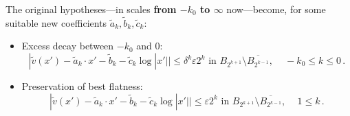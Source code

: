 \documentclass[10pt,a4paper]{amsart}
\newcommand{\ep}{\varepsilon}
\begin{document}
\begin{remark}\label{rmk:89ttqovbaB}
    The original hypotheses---in scales \textbf{from $-k_0$ to $\infty$} now---become, for some suitable new coefficients $\widetilde a_k, \widetilde b_k, \widetilde c_k$:
    \begin{itemize}
    \item Excess decay between $-k_0$ and $0$:
    \begin{equation}\label{eq:52ei7t6siduB}
        |\widetilde v (x')-\widetilde a_k\cdot x'-\widetilde b_k-\widetilde c_k\log|x'||\leq \delta^{k}\ep 2^{k} \mbox{ in } B_{2^{k+1}}\setminus \overline{B_{2^{k-1}}},\,\quad -k_0\leq k \leq 0\,.
    \end{equation}
    \item Preservation of best flatness:
    \begin{equation}\label{eq:52ei7t6sidu2B}
        |\widetilde v (x')-\widetilde a_k\cdot x'-\widetilde b_k-\widetilde c_k\log|x'||\leq \ep 2^{k} \mbox{ in } B_{2^{k+1}}\setminus \overline{B_{2^{k-1}}},\,\quad 1\leq k \,.
    \end{equation}
\end{itemize}
\end{remark}
\end{document}
